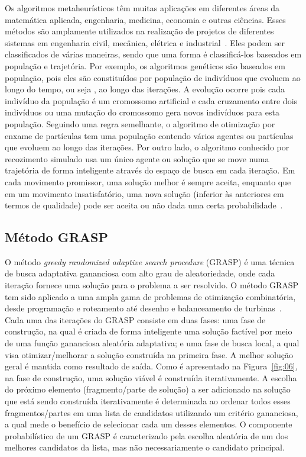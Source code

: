 Os algoritmos metaheurísticos têm muitas aplicações em diferentes áreas da matemática aplicada, engenharia, medicina, economia e outras ciências. Esses métodos são amplamente utilizados na realização de projetos de diferentes sistemas em engenharia civil, mecânica, elétrica e industrial~\citep{kaveh2014advances}. Eles podem ser classificados de várias maneiras, sendo que uma forma é classificá-los baseados em população e trajetória. Por exemplo, os algoritmos genéticos são baseados em população, pois eles são constituídos por população de indivíduos que evoluem ao longo do tempo, ou seja , ao longo das iterações. A evolução ocorre pois cada indivíduo da população é um cromossomo artificial e cada cruzamento entre dois indivíduos ou uma mutação do cromossomo gera novos indivíduos para esta população. Seguindo uma regra semelhante, o algoritmo de otimização por enxame de partículas tem uma população contendo vários agentes ou partículas que evoluem ao longo das iterações. Por outro lado, o algoritmo conhecido por recozimento simulado usa um único agente ou solução que se move numa trajetória de forma inteligente através do espaço de busca em cada iteração. Em cada movimento promissor, uma solução melhor é sempre aceita, enquanto que em um movimento insatisfatório, uma nova solução (inferior às anteriores em termos de qualidade) pode ser aceita ou não dada uma certa probabilidade~\citep{yang2010nature}.  

\subsection{Método GRASP}

O método {\it greedy randomized adaptive search procedure} (GRASP) é uma técnica de busca adaptativa gananciosa com alto grau de aleatoriedade, onde cada iteração fornece uma solução para o problema a ser resolvido. O método GRASP tem sido aplicado a uma ampla gama de problemas de otimização combinatória, desde programação e roteamento até desenho e balanceamento de turbinas~\citep{festa2009annotated}. Cada uma das iterações do GRASP consiste em duas fases: uma fase de construção, na qual é criada de forma inteligente uma solução factível por meio de uma função gananciosa aleatória adaptativa; e uma fase de busca local, a qual visa otimizar/melhorar a solução construída na primeira fase. A melhor solução geral é mantida como resultado de saída. Como é apresentado na Figura~\ref{fig:06}, na fase de construção, uma solução viável é construída iterativamente. A escolha do próximo elemento (fragmento/parte de solução) a ser adicionado na solução que está sendo construída iterativamente é determinada ao ordenar todos esses fragmentos/partes em uma lista de candidatos utilizando um critério gananciosa, a qual mede o benefício de selecionar cada um desses elementos. O componente probabilístico de um GRASP é caracterizado pela escolha aleatória de um dos melhores candidatos da lista, mas não necessariamente o candidato principal.  

